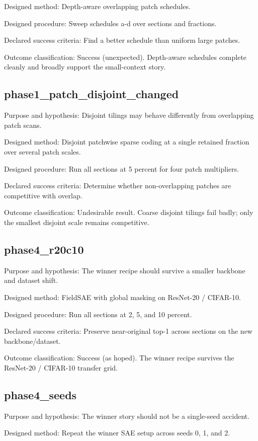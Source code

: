 \documentclass[11pt]{article}
\begin{document}
Designed method: Depth-aware overlapping patch schedules.


Designed procedure: Sweep schedules a-d over sections and fractions.


Declared success criteria: Find a better schedule than uniform large patches.


Outcome classification: Success (unexpected). Depth-aware schedules complete cleanly and broadly support the small-context story.


\subsection{phase1\_patch\_disjoint\_changed}
Purpose and hypothesis: Disjoint tilings may behave differently from overlapping patch scans.


Designed method: Disjoint patchwise sparse coding at a single retained fraction over several patch scales.


Designed procedure: Run all sections at 5 percent for four patch multipliers.


Declared success criteria: Determine whether non-overlapping patches are competitive with overlap.


Outcome classification: Undesirable result. Coarse disjoint tilings fail badly; only the smallest disjoint scale remains competitive.


\subsection{phase4\_r20c10}
Purpose and hypothesis: The winner recipe should survive a smaller backbone and dataset shift.


Designed method: FieldSAE with global masking on ResNet-20 / CIFAR-10.


Designed procedure: Run all sections at 2, 5, and 10 percent.


Declared success criteria: Preserve near-original top-1 across sections on the new backbone/dataset.


Outcome classification: Success (as hoped). The winner recipe survives the ResNet-20 / CIFAR-10 transfer grid.


\subsection{phase4\_seeds}
Purpose and hypothesis: The winner story should not be a single-seed accident.


Designed method: Repeat the winner SAE setup across seeds 0, 1, and 2.
\end{document}
